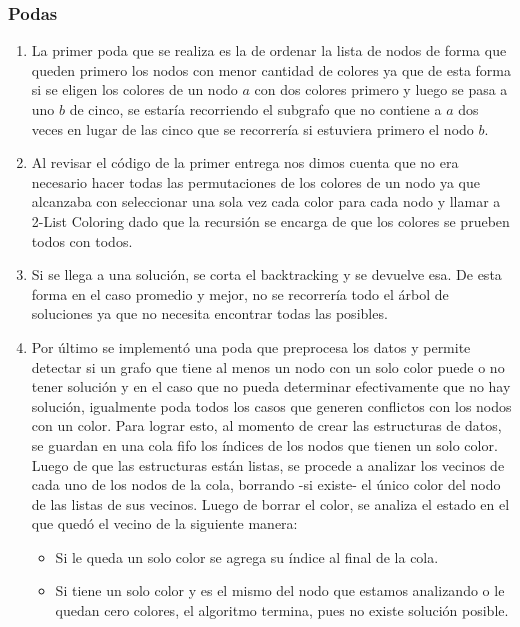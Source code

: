 \subsubsection{Podas}
\label{sec:podas}
\begin{enumerate}
	\item \label{it:p1} La primer poda que se realiza es la de ordenar la lista de nodos de forma que queden primero los nodos con menor cantidad de colores ya que de esta forma si se eligen los colores de un nodo $a$ con dos colores primero y luego se pasa a uno $b$ de cinco, se estaría recorriendo el subgrafo que no contiene a $a$ dos veces en lugar de las cinco que se recorrería si estuviera primero el nodo $b$.
	
	\item \label{it:p2} Al revisar el código de la primer entrega nos dimos cuenta que no era necesario hacer todas las permutaciones de los colores de un nodo ya que alcanzaba con seleccionar una sola vez cada color para cada nodo y llamar a 2-List Coloring dado que la recursión se encarga de que los colores se prueben todos con todos.
	
	\item \label{it:p3} Si se llega a una solución, se corta el backtracking y se devuelve esa. De esta forma en el caso promedio y mejor, no se recorrería todo el árbol de soluciones ya que no necesita encontrar todas las posibles.
	\item \label{it:p4} Por último se implementó una poda que preprocesa los datos y permite detectar si un grafo que tiene al menos un nodo con un solo color puede o no tener solución y en el caso que no pueda determinar efectivamente que no hay solución, igualmente poda todos los casos que generen conflictos con los nodos con un color. Para lograr esto, al momento de crear las estructuras de datos, se guardan en una cola fifo los índices de los nodos que tienen un solo color. Luego de que las estructuras están listas, se procede a analizar los vecinos de cada uno de los nodos de la cola, borrando -si existe- el único color del nodo de las listas de sus vecinos. Luego de borrar el color, se analiza el estado en el que quedó el vecino de la siguiente manera:
	\begin{itemize}
	\item Si le queda un solo color se agrega su índice al final de la cola.
	\item Si tiene un solo color y es el mismo del nodo que estamos analizando o le quedan cero colores, el algoritmo termina, pues no existe solución posible.
	\end{itemize}
	 
\end{enumerate}

